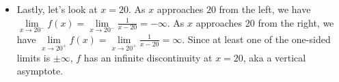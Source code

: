 \documentclass[main]{subfiles}
\begin{document}
\begin{enumerate}[resume]
\begin{solution}
\begin{itemize}
    \item
    Lastly, let's look at $x=20$. As $x$ approaches $20$ from the left, we have
    $\lim\limits_{x \to 20^-} f(x) = \lim\limits_{x \to 20^-} \frac{1}{x-20} = -\infty$. 
    As $x$ approaches $20$ from the right,
    we have $\lim\limits_{x \to 20^+} f(x) =\lim\limits_{x \to 20^+} \frac{1}{x-20}=
    \infty$. Since at least one of the one-sided limits is $\pm \infty$, $f$ has an infinite
    discontinuity at $x=20$, aka a vertical asymptote. 

    \end{itemize}
    
  \end{solution}

\end{enumerate}
\end{document}
